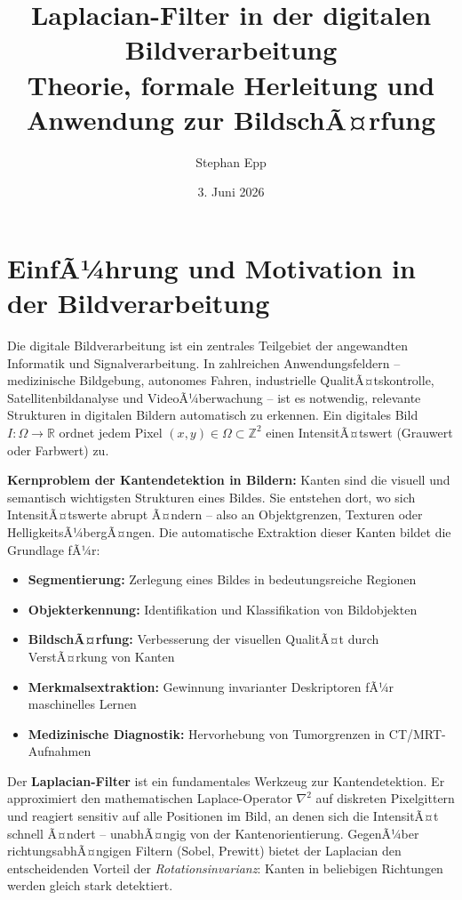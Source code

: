 ﻿\documentclass[a4paper,12pt]{article}
\title{\textbf{Laplacian-Filter in der digitalen Bildverarbeitung}\\
\large Theorie, formale Herleitung und Anwendung zur BildschÃ¤rfung}
\author{Stephan Epp\\}
\date{3. Juni 2026}
\theoremstyle{definition}
\begin{document}
\maketitle
\tableofcontents
\newpage

\section{EinfÃ¼hrung und Motivation in der Bildverarbeitung}

Die digitale Bildverarbeitung ist ein zentrales Teilgebiet der angewandten Informatik und
Signalverarbeitung. In zahlreichen Anwendungsfeldern -- medizinische Bildgebung, autonomes
Fahren, industrielle QualitÃ¤tskontrolle, Satellitenbildanalyse und VideoÃ¼berwachung -- ist es
notwendig, relevante Strukturen in digitalen Bildern automatisch zu erkennen. Ein digitales
Bild $I: \Omega \to \mathbb{R}$ ordnet jedem Pixel $(x, y) \in \Omega \subset \mathbb{Z}^2$
einen IntensitÃ¤tswert (Grauwert oder Farbwert) zu.

\textbf{Kernproblem der Kantendetektion in Bildern:} Kanten sind die visuell und semantisch
wichtigsten Strukturen eines Bildes. Sie entstehen dort, wo sich IntensitÃ¤tswerte abrupt Ã¤ndern
-- also an Objektgrenzen, Texturen oder HelligkeitsÃ¼bergÃ¤ngen. Die automatische Extraktion dieser
Kanten bildet die Grundlage fÃ¼r:
\begin{itemize}
    \item \textbf{Segmentierung:} Zerlegung eines Bildes in bedeutungsreiche Regionen
    \item \textbf{Objekterkennung:} Identifikation und Klassifikation von Bildobjekten
    \item \textbf{BildschÃ¤rfung:} Verbesserung der visuellen QualitÃ¤t durch VerstÃ¤rkung von Kanten
    \item \textbf{Merkmalsextraktion:} Gewinnung invarianter Deskriptoren fÃ¼r maschinelles Lernen
    \item \textbf{Medizinische Diagnostik:} Hervorhebung von Tumorgrenzen in CT/MRT-Aufnahmen
\end{itemize}

Der \textbf{Laplacian-Filter} ist ein fundamentales Werkzeug zur Kantendetektion. Er approximiert
den mathematischen Laplace-Operator $\nabla^2$ auf diskreten Pixelgittern und reagiert sensitiv
auf alle Positionen im Bild, an denen sich die IntensitÃ¤t schnell Ã¤ndert -- unabhÃ¤ngig von der
Kantenorientierung. GegenÃ¼ber richtungsabhÃ¤ngigen Filtern (Sobel, Prewitt) bietet der Laplacian
den entscheidenden Vorteil der \emph{Rotationsinvarianz}: Kanten in beliebigen Richtungen werden
gleich stark detektiert.
\end{document}

